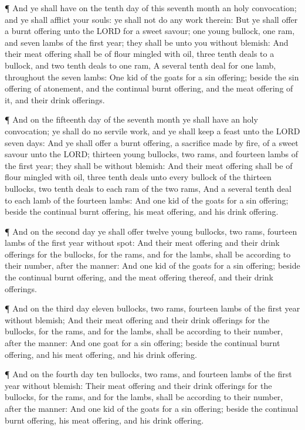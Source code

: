  ¶ And ye shall have on the tenth day of this seventh month
an holy convocation; and ye shall afflict your souls: ye shall not do
any work therein:  But ye shall offer a burnt offering unto
the LORD for a sweet savour; one young bullock, one ram, and seven lambs
of the first year; they shall be unto you without blemish: 
And their meat offering shall be of flour mingled with oil, three tenth
deals to a bullock, and two tenth deals to one ram,  A
several tenth deal for one lamb, throughout the seven lambs:
 One kid of the goats for a sin offering; beside the sin
offering of atonement, and the continual burnt offering, and the meat
offering of it, and their drink offerings.

 ¶ And on the fifteenth day of the seventh month ye shall
have an holy convocation; ye shall do no servile work, and ye shall keep
a feast unto the LORD seven days:  And ye shall offer a
burnt offering, a sacrifice made by fire, of a sweet savour unto the
LORD; thirteen young bullocks, two rams, and fourteen lambs of the first
year; they shall be without blemish:  And their meat
offering shall be of flour mingled with oil, three tenth deals unto
every bullock of the thirteen bullocks, two tenth deals to each ram of
the two rams,  And a several tenth deal to each lamb of the
fourteen lambs:  And one kid of the goats for a sin
offering; beside the continual burnt offering, his meat offering, and
his drink offering.

 ¶ And on the second day ye shall offer twelve young
bullocks, two rams, fourteen lambs of the first year without spot:
 And their meat offering and their drink offerings for the
bullocks, for the rams, and for the lambs, shall be according to their
number, after the manner:  And one kid of the goats for a
sin offering; beside the continual burnt offering, and the meat offering
thereof, and their drink offerings.

 ¶ And on the third day eleven bullocks, two rams, fourteen
lambs of the first year without blemish;  And their meat
offering and their drink offerings for the bullocks, for the rams, and
for the lambs, shall be according to their number, after the manner:
 And one goat for a sin offering; beside the continual
burnt offering, and his meat offering, and his drink offering.

 ¶ And on the fourth day ten bullocks, two rams, and
fourteen lambs of the first year without blemish:  Their
meat offering and their drink offerings for the bullocks, for the rams,
and for the lambs, shall be according to their number, after the manner:
 And one kid of the goats for a sin offering; beside the
continual burnt offering, his meat offering, and his drink offering.

